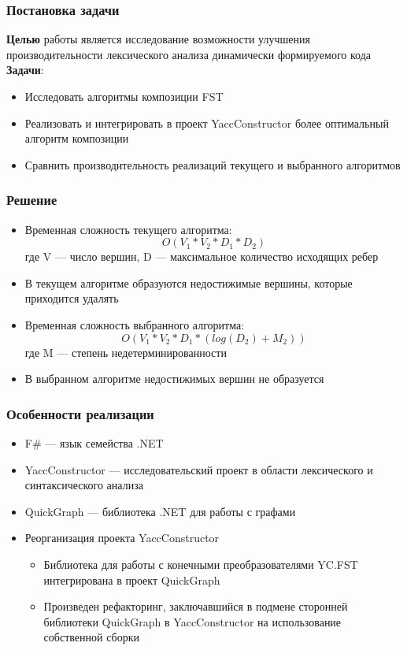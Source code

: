 \documentclass{beamer}
\begin{document}
\begin{frame}
  \transwipe[direction=90]
  \frametitle{Постановка задачи}
  \textbf{Целью} работы является исследование возможности улучшения
  производительности лексического анализа динамически 
  формируемого кода\\[2\baselineskip]

  \textbf{Задачи}:
  \begin{itemize}
    \item Исследовать алгоритмы композиции FST
    \item Реализовать и интегрировать в проект YaccConstructor более оптимальный алгоритм композиции
    \item Сравнить производительность реализаций текущего и выбранного алгоритмов
  \end{itemize}
\end{frame}

\begin{frame}
  \transwipe[direction=90]
  \frametitle{Решение}
  \begin{itemize}
    \item Временная сложность текущего алгоритма: \\
    \[O(V_1 * V_2 * D_1 * D_2)\]
    где V — число вершин, D — максимальное количество исходящих ребер
    \item В текущем алгоритме образуются недостижимые вершины, которые приходится удалять
    \item Временная сложность выбранного алгоритма: \\
    \[O(V_1 * V_2 * D_1 * (log(D_2) + M_2))\]
    где M — степень недетерминированности
    \item В выбранном алгоритме недостижимых вершин не образуется
  \end{itemize}
\end{frame}

\begin{frame}
  \transwipe[direction=90]
  \frametitle{Особенности реализации}
  \begin{itemize}
    \item F\# — язык семейства .NET
    \item YaccConstructor — исследовательский проект в области лексического и синтаксического анализа
    \item QuickGraph — библиотека .NET для работы с графами
    \item Реорганизация проекта YaccConstructor
    \begin{itemize}
      \item Библиотека для работы с конечными преобразователями YC.FST интегрирована в проект QuickGraph
      \item Произведен рефакторинг, заключавшийся в подмене сторонней библиотеки QuickGraph в YaccConstructor на использование собственной сборки
    \end{itemize}
  \end{itemize}
\end{frame}
\end{document}
